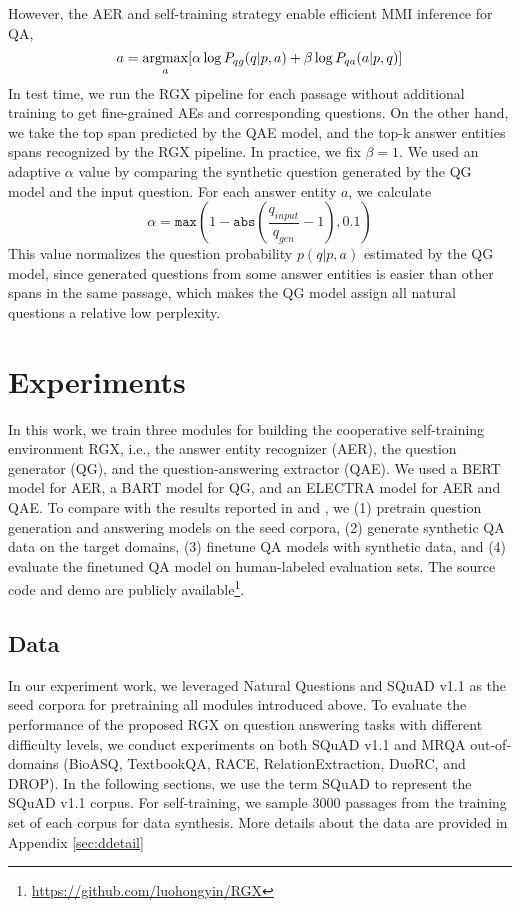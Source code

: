 \documentclass[11pt,a4paper]{article}
\begin{document}
However, the AER and self-training strategy enable efficient MMI inference for QA,
\[
a = \underset{a}{\mathrm{argmax}} [\alpha \* \log P_{qg}(q | p, a) + \beta \* \log P_{qa} (a | p, q)]
\]
In test time, we run the RGX pipeline for each passage without additional training to get fine-grained AEs and corresponding questions. On the other hand, we take the top span predicted by the QAE model, and the top-k answer entities spans recognized by the RGX pipeline. In practice, we fix $\beta = 1$. We used an adaptive $\alpha$ value by comparing the synthetic question generated by the QG model and the input question. For each answer entity $a$, we calculate
\[
\alpha = \texttt{max} (1 - \texttt{abs} (\frac{q_{input}}{q_{gen}} - 1), 0.1)
\]
This value normalizes the question probability $p(q|p, a)$ estimated by the QG model, since generated questions from some answer entities is easier than other spans in the same passage, which makes the QG model assign all natural questions a relative low perplexity.



\section{Experiments}
In this work, we train three modules for building the cooperative self-training environment RGX, i.e., the answer entity recognizer (AER), the question generator (QG), and the question-answering extractor (QAE). We used a BERT \cite{devlin2018bert} model for AER, a BART \cite{lewis2019bart} model for QG, and an ELECTRA \cite{clark2019electra} model for AER and QAE. To compare with the results reported in \citet{shakeri2020end} and \citet{bartolo2021improving}, we (1) pretrain question generation and answering models on the seed corpora, (2) generate synthetic QA data on the target domains, (3) finetune QA models with synthetic data, and (4) evaluate the finetuned QA model on human-labeled evaluation sets. The source code and demo are publicly available\footnote{\url{https://github.com/luohongyin/RGX}}.



\subsection{Data}
In our experiment work, we leveraged Natural Questions \cite{kwiatkowski2019natural} and SQuAD v1.1 \cite{rajpurkar2016SQuAD} as the seed corpora for pretraining all modules introduced above. To evaluate the performance of the proposed RGX on question answering tasks with different difficulty levels, we conduct experiments on both SQuAD v1.1 \cite{rajpurkar2016SQuAD} and MRQA \cite{fisch2019mrqa} out-of-domains (BioASQ, TextbookQA, RACE, RelationExtraction, DuoRC, and DROP). In the following sections, we use the term SQuAD to represent the SQuAD v1.1 corpus. For self-training, we sample 3000 passages from the training set of each corpus for data synthesis. More details about the data are provided in Appendix \ref{sec:ddetail}
\end{document}
